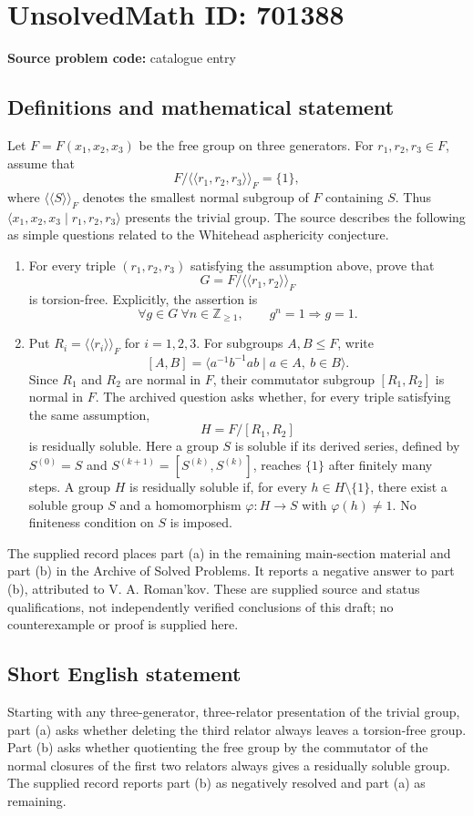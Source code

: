 \documentclass[11pt]{article}
\newcommand{\Z}{\mathbb{Z}}
\begin{document}
\section*{UnsolvedMath ID: 701388}
\textbf{Source problem code:} catalogue entry
\subsection{Definitions and mathematical statement}
Let \(F=F(x_1,x_2,x_3)\) be the free group on three generators. For \(r_1,r_2,r_3\in F\), assume that
\[
F/\langle\!\langle r_1,r_2,r_3\rangle\!\rangle_F=\{1\},
\]
where \(\langle\!\langle S\rangle\!\rangle_F\) denotes the smallest normal subgroup of \(F\) containing \(S\). Thus \(\langle x_1,x_2,x_3\mid r_1,r_2,r_3\rangle\) presents the trivial group. The source describes the following as simple questions related to the Whitehead asphericity conjecture.

\begin{enumerate}
\item[(a)] For every triple \((r_1,r_2,r_3)\) satisfying the assumption above, prove that
\[
G=F/\langle\!\langle r_1,r_2\rangle\!\rangle_F
\]
is torsion-free. Explicitly, the assertion is
\[
\forall g\in G\ \forall n\in\Z_{\geq 1},\qquad g^n=1\Longrightarrow g=1.
\]
\item[(b)] Put \(R_i=\langle\!\langle r_i\rangle\!\rangle_F\) for \(i=1,2,3\). For subgroups \(A,B\leq F\), write
\[
[A,B]=\langle a^{-1}b^{-1}ab\mid a\in A,\ b\in B\rangle.
\]
Since \(R_1\) and \(R_2\) are normal in \(F\), their commutator subgroup \([R_1,R_2]\) is normal in \(F\). The archived question asks whether, for every triple satisfying the same assumption,
\[
H=F/[R_1,R_2]
\]
is residually soluble. Here a group \(S\) is soluble if its derived series, defined by \(S^{(0)}=S\) and \(S^{(k+1)}=[S^{(k)},S^{(k)}]\), reaches \(\{1\}\) after finitely many steps. A group \(H\) is residually soluble if, for every \(h\in H\setminus\{1\}\), there exist a soluble group \(S\) and a homomorphism \(\varphi:H\to S\) with \(\varphi(h)\ne 1\). No finiteness condition on \(S\) is imposed.
\end{enumerate}

The supplied record places part (a) in the remaining main-section material and part (b) in the Archive of Solved Problems. It reports a negative answer to part (b), attributed to V. A. Roman'kov. These are supplied source and status qualifications, not independently verified conclusions of this draft; no counterexample or proof is supplied here.
\subsection{Short English statement}
Starting with any three-generator, three-relator presentation of the trivial group, part (a) asks whether deleting the third relator always leaves a torsion-free group. Part (b) asks whether quotienting the free group by the commutator of the normal closures of the first two relators always gives a residually soluble group. The supplied record reports part (b) as negatively resolved and part (a) as remaining.
\end{document}

